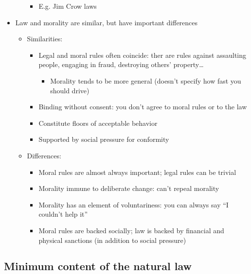 \begin{itemize}
\begin{itemize}
    \begin{itemize}
    \tightlist
    \item
      E.g. Jim Crow laws
    \end{itemize}
  \end{itemize}
\item
  Law and morality are similar, but have important differences

  \begin{itemize}
  \tightlist
  \item
    Similarities:

    \begin{itemize}
    \tightlist
    \item
      Legal and moral rules often coincide: ther are rules against
      assaulting people, engaging in fraud, destroying others'
      property\ldots{}

      \begin{itemize}
      \tightlist
      \item
        Morality tends to be more general (doesn't specify how fast you
        should drive)
      \end{itemize}
    \item
      Binding without consent: you don't agree to moral rules or to the
      law
    \item
      Constitute floors of acceptable behavior
    \item
      Supported by social pressure for conformity
    \end{itemize}
  \item
    Differences:

    \begin{itemize}
    \tightlist
    \item
      Moral rules are almost always important; legal rules can be
      trivial
    \item
      Morality immune to deliberate change: can't repeal morality
    \item
      Morality has an element of voluntariness: you can always say ``I
      couldn't help it''
    \item
      Moral rules are backed socially; law is backed by financial and
      physical sanctions (in addition to social pressure)
    \end{itemize}
  \end{itemize}
\end{itemize}

\hypertarget{minimum-content-of-the-natural-law}{%
\subsection{Minimum content of the natural
law}\label{minimum-content-of-the-natural-law}}

